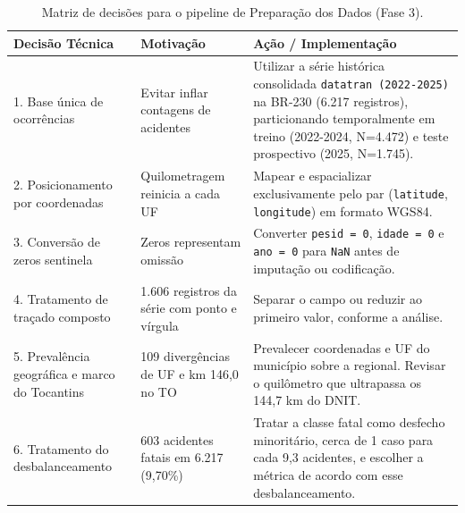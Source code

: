 \documentclass[11pt,a4paper]{article}
\begin{document}
\begin{table}[H]
\centering
\small
\renewcommand{\arraystretch}{1.25}
\caption{Matriz de decisões para o pipeline de Preparação dos Dados (Fase 3).}
\label{tab:encaminhamentos}
\begin{tabularx}{\textwidth}{|p{4.2cm}|p{3.5cm}|X|}
\hline
\textbf{Decisão Técnica} & \textbf{Motivação} & \textbf{Ação / Implementação} \\
\hline
1. Base única de ocorrências & Evitar inflar contagens de acidentes & Utilizar a série histórica consolidada \texttt{datatran (2022-2025)} na BR-230 (6.217 registros), particionando temporalmente em treino (2022-2024, N=4.472) e teste prospectivo (2025, N=1.745). \\
\hline
2. Posicionamento por coordenadas & Quilometragem reinicia a cada UF & Mapear e espacializar exclusivamente pelo par (\texttt{latitude}, \texttt{longitude}) em formato WGS84. \\
\hline
3. Conversão de zeros sentinela & Zeros representam omissão & Converter \texttt{pesid = 0}, \texttt{idade = 0} e \texttt{ano = 0} para \texttt{NaN} antes de imputação ou codificação. \\
\hline
4. Tratamento de traçado composto & 1.606 registros da série com ponto e vírgula & Separar o campo ou reduzir ao primeiro valor, conforme a análise. \\
\hline
5. Prevalência geográfica e marco do Tocantins & 109 divergências de UF e km 146,0 no TO & Prevalecer coordenadas e UF do município sobre a regional. Revisar o quilômetro que ultrapassa os 144,7 km do DNIT. \\
\hline
6. Tratamento do desbalanceamento & 603 acidentes fatais em 6.217 (9,70\%) & Tratar a classe fatal como desfecho minoritário, cerca de 1 caso para cada 9,3 acidentes, e escolher a métrica de acordo com esse desbalanceamento. \\
\hline
\end{tabularx}
\end{table}

\newpage


\end{document}
